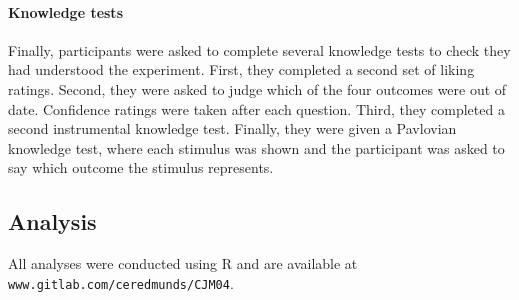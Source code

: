 \documentclass[12pt]{article}
\begin{document}
\paragraph{Knowledge tests}
Finally, participants were asked to complete several knowledge tests to check
they had understood the experiment. First, they completed a second set of
liking ratings. Second, they were asked to judge which of the four outcomes 
were out of date. Confidence ratings were taken after each question. Third,
they completed a second instrumental knowledge test. Finally, they were given a
Pavlovian knowledge test, where each stimulus was shown and the participant was
asked to say which outcome the stimulus represents. 

\subsection{Analysis} 
All analyses were conducted using R \cite{Rcite} and are available at
\texttt{www.gitlab.com/ceredmunds/CJM04}.

\newpage


\end{document}
